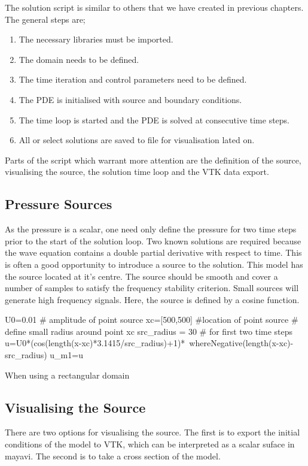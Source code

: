 The solution script is similar to others that we have created in previous
chapters. The general steps are;
\begin{enumerate}
 \item The necessary libraries must be imported.
 \item The domain needs to be defined.
 \item The time iteration and control parameters need to be defined.
 \item The PDE is initialised with source and boundary conditions.
 \item The time loop is started and the PDE is solved at consecutive time steps.
 \item All or select solutions are saved to file for visualisation lated on.
\end{enumerate}

Parts of the script which warrant more attention are the definition of the
source, visualising the source, the solution time loop and the VTK data export.

\subsection{Pressure Sources}
As the pressure is a scalar, one need only define the pressure for two 
time steps prior to the start of the solution loop. Two known solutions are
required because the wave equation contains a double partial derivative with
respect to time. This is often a good opportunity to introduce a source to the
solution. This model has the source located at it's centre. The source should
be smooth and cover a number of samples to satisfy the frequency stability
criterion. Small sources will generate high frequency signals. Here, the source
is defined by a cosine function.
\begin{python}
U0=0.01 # amplitude of point source
xc=[500,500] #location of point source
# define small radius around point xc
src_radius = 30
# for first two time steps
u=U0*(cos(length(x-xc)*3.1415/src_radius)+1)*\
	whereNegative(length(x-xc)-src_radius)
u_m1=u
\end{python}
When using a rectangular domain

\subsection{Visualising the Source}
There are two options for visualising the source. The first is to export the
initial conditions of the model to VTK, which can be interpreted as a scalar
suface in mayavi. The second is to take a cross section of the model.

